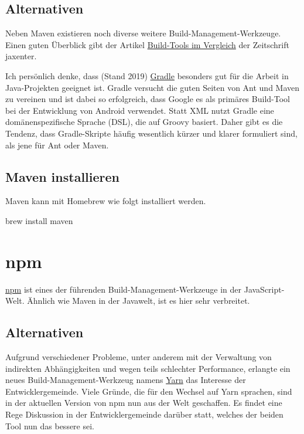 \documentclass[]{article}
\begin{document}
\subsection{Alternativen}
Neben Maven existieren noch diverse weitere Build-Management-Werkzeuge. Einen guten Überblick gibt der Artikel \href{https://jaxenter.de/8-build-tools-im-vergleich-ant-buildr-maven-bazel-buck-gradle-pants-sbt-41627}{Build-Tools im Vergleich} der Zeitschrift jaxenter.

Ich persönlich denke, dass (Stand 2019) \href{https://gradle.org/}{Gradle} besonders gut für die Arbeit in Java-Projekten geeignet ist. Gradle versucht die guten Seiten von Ant und Maven zu vereinen und ist dabei so erfolgreich, dass Google es als primäres Build-Tool bei der Entwicklung von Android verwendet. Statt XML nutzt Gradle eine domänenspezifische Sprache (DSL), die auf Groovy basiert. Daher gibt es die Tendenz, dass Gradle-Skripte häufig wesentlich kürzer und klarer formuliert sind, als jene für Ant oder Maven.

\subsection{Maven installieren}
Maven kann mit Homebrew wie folgt installiert werden.
\begin{bashcode}
brew install maven
\end{bashcode}



\section{npm}
\href{https://www.npmjs.com/}{npm} ist eines der führenden Build-Management-Werkzeuge in der JavaScript-Welt. Ähnlich wie Maven in der Javawelt, ist es hier sehr verbreitet. 

\subsection{Alternativen}
Aufgrund verschiedener Probleme, unter anderem mit der Verwaltung von indirekten Abhängigkeiten und wegen teils schlechter Performance, erlangte ein neues Build-Management-Werkzeug namens \href{https://yarnpkg.com}{Yarn} das Interesse der Entwicklergemeinde. Viele Gründe, die für den Wechsel auf Yarn sprachen, sind in der aktuellen Version von npm nun aus der Welt geschaffen. Es findet eine Rege Diskussion in der Entwicklergemeinde darüber statt, welches der beiden Tool nun das bessere sei.
\end{document}
